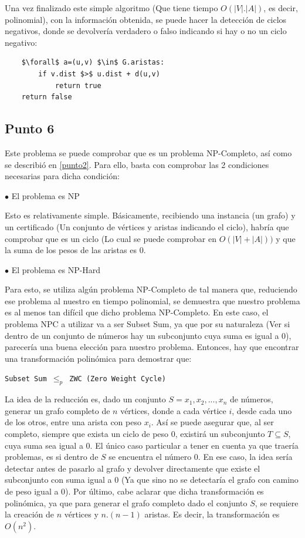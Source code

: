 \documentclass[a4paper,10pt]{article}
\begin{document}
	Una vez finalizado este simple algoritmo (Que tiene tiempo $O(|V|.|A|)$, es decir, polinomial), con la información obtenida, se puede hacer la detección de ciclos negativos, donde se devolvería verdadero o falso indicando si hay o no un ciclo negativo:
	\begin{lstlisting}
	$\forall$ a=(u,v) $\in$ G.aristas:
	    if v.dist $>$ u.dist + d(u,v)
	        return true
	return false
	\end{lstlisting}

\subsection{Punto 6}
	Este problema se puede comprobar que es un problema NP-Completo, así como se describió en \ref{punto2}. Para ello, basta con comprobar las 2 condiciones necesarias para dicha condición:

	$\bullet$ El problema es NP

	Esto es relativamente simple. Básicamente, recibiendo una instancia (un grafo) y un certificado (Un conjunto de vértices y aristas indicando el ciclo), habría que comprobar que es un ciclo (Lo cual se puede comprobar en $O(|V|+|A|))$ y que la suma de los pesos de las aristas es 0.
	\linebreak

	$\bullet$ El problema es NP-Hard

	Para esto, se utiliza algún problema NP-Completo de tal manera que, reduciendo ese problema al nuestro en tiempo polinomial, se demuestra que nuestro problema es al menos tan difícil que dicho problema NP-Completo. En este caso, el problema NPC a utilizar va a ser Subset Sum, ya que por su naturaleza (Ver si dentro de un conjunto de números hay un subconjunto cuya suma es igual a 0), parecería una buena elección para nuestro problema. Entonces, hay que encontrar una transformación polinómica para demostrar que:

	\texttt{Subset Sum $\leq_p$ ZWC (Zero Weight Cycle)}
	\linebreak

	La idea de la reducción es, dado un conjunto $S={x_1, x_2, ..., x_n}$ de números, generar un grafo completo de $n$ vértices, donde a cada vértice $i$, desde cada uno de los otros, entre una arista con peso $x_i$. Así se puede asegurar que, al ser completo, siempre que exista un ciclo de peso 0, existirá un subconjunto $T \subseteq S$, cuya suma sea igual a 0. El único caso particular a tener en cuenta ya que traería problemas, es si dentro de $S$ se encuentra el número 0. En ese caso, la idea sería detectar antes de pasarlo al grafo y devolver directamente que existe el subconjunto con suma igual a 0 (Ya que sino no se detectaría el grafo con camino de peso igual a 0). Por último, cabe aclarar que dicha transformación es polinómica, ya que para generar el grafo completo dado el conjunto $S$, se requiere la creación de $n$ vértices y $n.(n-1)$ aristas. Es decir, la transformación es $O(n^2)$.
\end{document}
